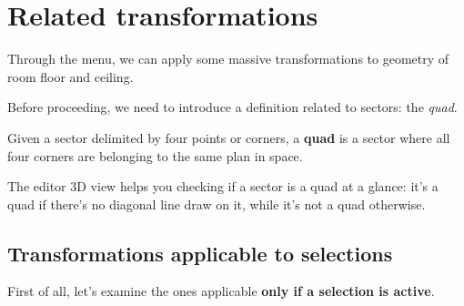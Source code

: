 

\chapter{Related transformations}

Through the  menu, we can apply some massive transformations to geometry of room floor and ceiling.

Before proceeding, we need to introduce a definition related to sectors: the \emph{quad}.

\begin{remark}
    Given a sector delimited by four points or corners, a \textbf{quad} is a sector where all four corners are belonging to the same plan in space.
\end{remark}

The editor 3D view helps you checking if a sector is a quad at a glance: it's a quad if there's no diagonal line draw on it, while it's not a quad otherwise.

\section{Transformations applicable to selections}

First of all, let's examine the ones applicable \textbf{only if a selection is active}.

